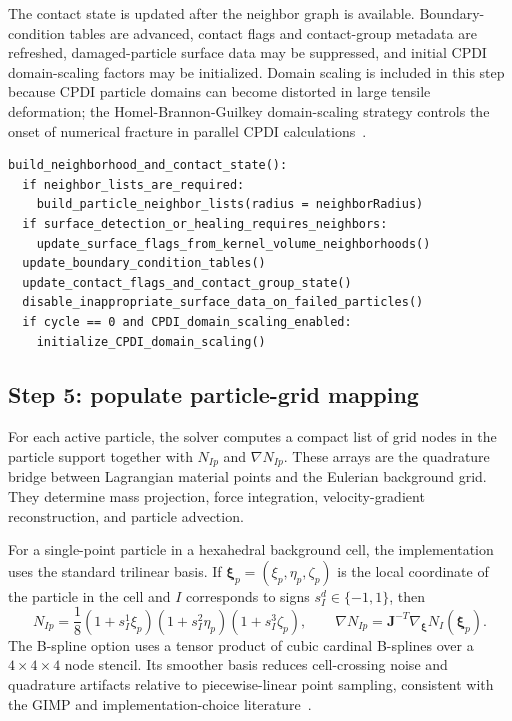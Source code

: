 The contact state is updated after the neighbor graph is available.  Boundary-condition tables are advanced, contact flags and contact-group metadata are refreshed, damaged-particle surface data may be suppressed, and initial CPDI domain-scaling factors may be initialized.  Domain scaling is included in this step because CPDI particle domains can become distorted in large tensile deformation; the Homel-Brannon-Guilkey domain-scaling strategy controls the onset of numerical fracture in parallel CPDI calculations~\cite{homel2016domaindef}.

\begin{lstlisting}[caption={Neighborhood and contact state update.},basicstyle=\ttfamily\small]
build_neighborhood_and_contact_state():
  if neighbor_lists_are_required:
    build_particle_neighbor_lists(radius = neighborRadius)
  if surface_detection_or_healing_requires_neighbors:
    update_surface_flags_from_kernel_volume_neighborhoods()
  update_boundary_condition_tables()
  update_contact_flags_and_contact_group_state()
  disable_inappropriate_surface_data_on_failed_particles()
  if cycle == 0 and CPDI_domain_scaling_enabled:
    initialize_CPDI_domain_scaling()
\end{lstlisting}

\subsection{Step 5: populate particle-grid mapping}
\label{subsec:solver-step-5}
For each active particle, the solver computes a compact list of grid nodes in the particle support together with $N_{Ip}$ and $\nabla N_{Ip}$.  These arrays are the quadrature bridge between Lagrangian material points and the Eulerian background grid.  They determine mass projection, force integration, velocity-gradient reconstruction, and particle advection.

For a single-point particle in a hexahedral background cell, the implementation uses the standard trilinear basis.  If $\boldsymbol{\xi}_p=(\xi_p,\eta_p,\zeta_p)$ is the local coordinate of the particle in the cell and $I$ corresponds to signs $s_I^d\in\{-1,1\}$, then
\begin{equation}
  N_{Ip} = \frac{1}{8}(1+s_I^1\xi_p)(1+s_I^2\eta_p)(1+s_I^3\zeta_p),
  \qquad
  \nabla N_{Ip}=\mathbf{J}^{-T}\nabla_{\boldsymbol{\xi}}N_I(\boldsymbol{\xi}_p).
\end{equation}
The B-spline option uses a tensor product of cubic cardinal B-splines over a $4\times4\times4$ node stencil.  Its smoother basis reduces cell-crossing noise and quadrature artifacts relative to piecewise-linear point sampling, consistent with the GIMP and implementation-choice literature~\cite{bardenhagen2004gimp,steffen2008quadrature,steffen2008choices}.

